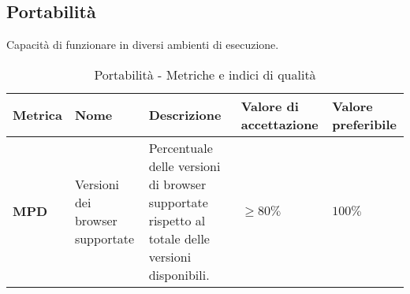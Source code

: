 \subsection{Portabilità}
Capacità di funzionare in diversi ambienti di esecuzione.
\begin{table}[H]
    \centering
    \begin{tabular}{|C{1.5cm}|L{3cm}|L{4cm}|L{2.5cm}|L{2.5cm}|}
        \hline
        \textbf{Metrica} & \textbf{Nome} & \textbf{Descrizione} & \textbf{Valore di accettazione} & \textbf{Valore preferibile} \\
        \hline
        \textbf{MPD} & Versioni dei browser supportate & Percentuale delle versioni di browser supportate rispetto al totale delle versioni disponibili. & $\geq 80\%$ & $100\%$ \\
        \hline
    \end{tabular}
    \caption{Portabilità - Metriche e indici di qualità}
    \label{tab:portabilità_qualita_prodotto}
\end{table}
